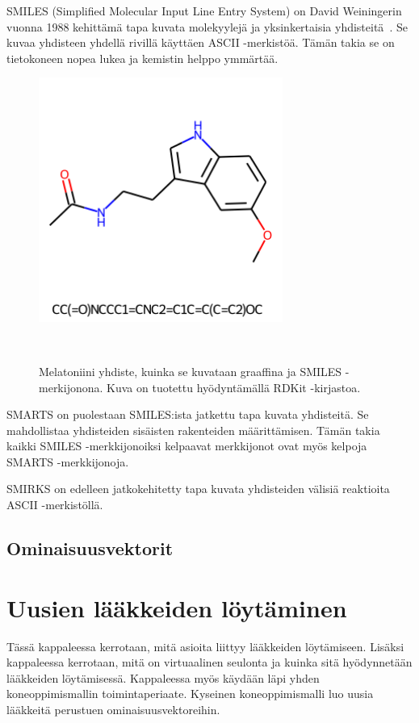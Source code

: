 \documentclass[finnish,twoside,censored,tkt,sw-line]{HYthesisML}
\begin{document}
SMILES (Simplified Molecular Input Line Entry System) on David Weiningerin vuonna 1988 kehittämä tapa kuvata molekyylejä ja yksinkertaisia yhdisteitä~\cite{WeiningerSMILES}.
Se kuvaa yhdisteen yhdellä rivillä käyttäen ASCII -merkistöä.
Tämän takia se on tietokoneen nopea lukea ja kemistin helppo ymmärtää.

\begin{figure}
    \centering
    \includegraphics[width=8cm, height=8cm]{melatonin-smiles.png}
    \caption{Melatoniini yhdiste, kuinka se kuvataan graaffina ja SMILES -merkijonona.
        Kuva on tuotettu hyödyntämällä RDKit -kirjastoa.}
    {~\cite{ShinBonggun}}
\end{figure}

SMARTS on puolestaan SMILES:ista jatkettu tapa kuvata yhdisteitä.
Se mahdollistaa yhdisteiden sisäisten rakenteiden määrittämisen.
Tämän takia kaikki SMILES -merkkijonoiksi kelpaavat merkkijonot ovat myös kelpoja SMARTS -merkkijonoja.

SMIRKS on edelleen jatkokehitetty tapa kuvata yhdisteiden välisiä reaktioita ASCII -merkistöllä.

\section{Ominaisuusvektorit}

\chapter{Uusien lääkkeiden löytäminen}


Tässä kappaleessa kerrotaan, mitä asioita liittyy lääkkeiden löytämiseen.
Lisäksi kappaleessa kerrotaan, mitä on virtuaalinen seulonta ja kuinka sitä hyödynnetään lääkkeiden löytämisessä.
Kappaleessa myös käydään läpi yhden koneoppimismallin toimintaperiaate.
Kyseinen koneoppimismalli luo uusia lääkkeitä perustuen ominaisuusvektoreihin.
\end{document}
